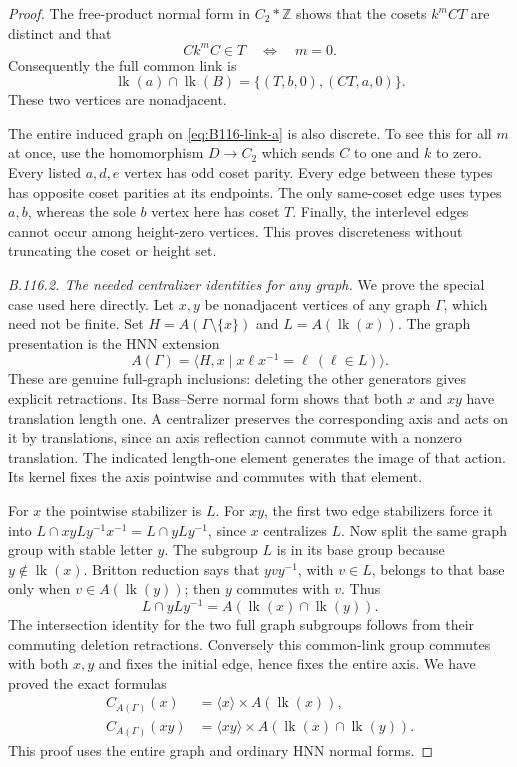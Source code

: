 \begin{proof}
The free-product normal form in $C_2*\mathbb Z$ shows that the
cosets $k^mCT$ are distinct and that
\[
 Ck^mC\in T\quad\Longleftrightarrow\quad m=0.
\]
Consequently the full common link is
\begin{equation}\label{eq:B116-common-link}
 \operatorname{lk}(a)\cap\operatorname{lk}(B)
       =\{(T,b,0),(CT,a,0)\}.
\end{equation}
These two vertices are nonadjacent.

The entire induced graph on \eqref{eq:B116-link-a} is also discrete.
To see this for all $m$ at once, use the homomorphism $D\to C_2$
which sends $C$ to one and $k$ to zero. Every listed $a,d,e$ vertex
has odd coset parity. Every edge between these types has opposite
coset parities at its endpoints. The only same-coset edge uses
types $a,b$, whereas the sole $b$ vertex here has coset $T$.
Finally, the interlevel edges cannot occur among height-zero vertices.
This proves discreteness without truncating the coset or height set.

\emph{B.116.2. The needed centralizer identities for any graph.}
We prove the special case used here directly. Let $x,y$ be nonadjacent
vertices of any graph $\Gamma$, which need not be finite. Set
$H=A(\Gamma\setminus\{x\})$ and $L=A(\operatorname{lk}(x))$.
The graph presentation is the HNN extension
\[
 A(\Gamma)=\langle H,x\mid x\ell x^{-1}=\ell\ (\ell\in L)\rangle.
\]
These are genuine full-graph inclusions: deleting the other generators
gives explicit retractions. Its Bass--Serre normal form shows that
both $x$ and $xy$ have translation length one. A centralizer preserves
the corresponding axis and acts on it by translations, since an axis
reflection cannot commute with a nonzero translation. The indicated
length-one element generates the image of that action. Its kernel
fixes the axis pointwise and commutes with that element.

For $x$ the pointwise stabilizer is $L$. For $xy$, the first two edge
stabilizers force it into
$L\cap xyLy^{-1}x^{-1}=L\cap yLy^{-1}$, since $x$ centralizes $L$.
Now split the same graph group with stable letter $y$. The subgroup
$L$ is in its base group because $y\notin\operatorname{lk}(x)$.
Britton reduction says that $yvy^{-1}$, with $v\in L$, belongs to
that base only when $v\in A(\operatorname{lk}(y))$; then $y$ commutes
with $v$. Thus
\[
 L\cap yLy^{-1}
   =A(\operatorname{lk}(x)\cap\operatorname{lk}(y)).
\]
The intersection identity for the two full graph subgroups follows
from their commuting deletion retractions. Conversely this common-link
group commutes with both $x,y$ and fixes the initial edge, hence fixes
the entire axis. We have proved the exact formulas
\begin{align}
 C_{A(\Gamma)}(x)&=\langle x\rangle\times A(\operatorname{lk}(x)),
 \label{eq:B116-vertex-centralizer}\\
 C_{A(\Gamma)}(xy)&=\langle xy\rangle\times
 A(\operatorname{lk}(x)\cap\operatorname{lk}(y)).
 \label{eq:B116-pair-centralizer}
\end{align}
This proof uses the entire graph and ordinary HNN normal forms.


\end{proof}

